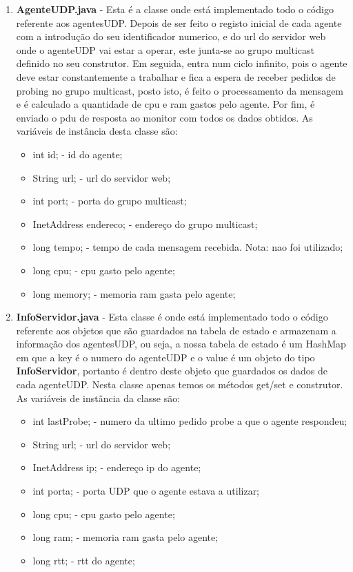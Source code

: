 \documentclass{llncs}
\begin{document}
			\begin{enumerate}

				\item \textbf{AgenteUDP.java} - Esta é a classe onde está implementado todo o código referente aos agentesUDP. Depois de ser feito o registo inicial de cada agente com a introdução do seu identificador numerico, e do url do servidor web onde o agenteUDP vai estar a operar, este junta-se ao grupo multicast definido no seu construtor. Em seguida, entra num ciclo infinito, pois o agente deve estar constantemente a trabalhar e fica a espera de receber pedidos de probing no grupo multicast, posto isto, é feito o processamento da mensagem e é calculado a quantidade de cpu e ram gastos pelo agente. Por fim, é enviado o pdu de resposta ao monitor com todos os dados obtidos. As variáveis de instância desta classe são:
					\begin{itemize}
						\item{int id;} - id do agente;
						\item{String url;} - url do servidor web;
						\item{int port;} - porta do grupo multicast;
						\item{InetAddress endereco;} - endereço do grupo multicast;
						\item{long tempo;} - tempo de cada mensagem recebida. Nota: nao foi utilizado;
						\item{long cpu;} - cpu gasto pelo agente;
						\item{long memory;} - memoria ram gasta pelo agente;
					\end{itemize}

				\bigskip
				\item \textbf{InfoServidor.java} - Esta classe é onde está implementado todo o código referente aos objetos que são guardados na tabela de estado e armazenam a informação dos agentesUDP, ou seja, a nossa tabela de estado é um HashMap em que a key é o numero do agenteUDP e o value é um objeto do tipo \textbf{InfoServidor}, portanto é dentro deste objeto que guardados os dados de cada agenteUDP. Nesta classe apenas temos os métodos get/set e construtor. As variáveis de instância da classe são:
					\begin{itemize}
						\item{int lastProbe;} - numero da ultimo pedido probe a que o agente respondeu;
						\item{String url;} - url do servidor web;
						\item{InetAddress ip;} - endereço ip do agente;
						\item{int porta;} - porta UDP que o agente estava a utilizar;
						\item{long cpu;} - cpu gasto pelo agente;
						\item{long ram;} - memoria ram gasta pelo agente;
						\item{long rtt;} - rtt do agente;
					\end{itemize}



\end{enumerate}
\end{document}

